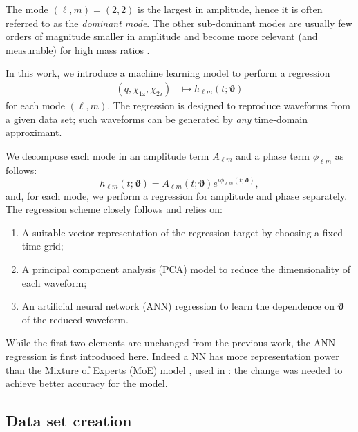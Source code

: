 \documentclass[twocolumn,showpacs,preprintnumbers,nofootinbib,prd,
superscriptaddress,10pt]{revtex4-2}
\begin{document}
The mode $(\ell, m) = (2,2)$ is the largest in amplitude, hence it is often referred to as the {\it dominant mode}. 
The other sub-dominant modes are usually few orders of magnitude smaller in amplitude and become more relevant 
(and measurable) for high mass ratios \cite{Mills:2020thr, LIGOScientific:2020stg, LIGOScientific:2020zkf}.

In this work, we introduce a machine learning model to perform a regression
\begin{align}\label{eq:objective}
	(q, \chi_\text{1z}, \chi_\text{2z}) &\longmapsto h_{\ell m}(t; \boldsymbol{\vartheta})
\end{align}
for each mode $(\ell,m)$.
The regression is designed to reproduce waveforms from a given data set; such waveforms can be generated 
by {\it any} time-domain approximant.

We decompose each mode in an amplitude term $A_{\ell m}$ and a phase term $\phi_{\ell m}$ as follows:
\begin{equation}\label{eq:amp_ph_decomposition}
	h_{\ell m}(t; \boldsymbol{\vartheta}) = A_{\ell m}(t; \boldsymbol{\vartheta}) e^{i \phi_{\ell m}(t; \boldsymbol{\vartheta})},
\end{equation}
and, for each mode, we perform a regression for amplitude and phase separately. The regression scheme closely follows \cite{Schmidt:2020yuu} and relies on:
\begin{enumerate}[label=(\alph*)]
	\item A suitable vector representation of the regression target by choosing a fixed time grid;
	\item A principal component analysis (PCA) model to reduce the dimensionality of each waveform;
	\item An artificial neural network (ANN) regression to learn the dependence on $\boldsymbol{\vartheta}$ of the 
	reduced waveform.
\end{enumerate}

While the first two elements are unchanged from the previous work, the ANN regression is first introduced here. Indeed a NN has more representation power than the Mixture of Experts (MoE) model \cite{Jacobs1991AdaptiveMoE}, used in \cite{Schmidt:2020yuu}: the change was needed to achieve better accuracy for the model.

\subsection{Data set creation}
\label{sec:dataset_creation}
\end{document}
